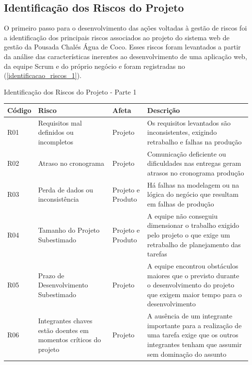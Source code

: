 \documentclass[
	12pt,				%
	openany,			%
	oneside,			%
	a4paper,			%
	english,			%
	french,				%
	spanish,			%
	brazil				%
	]{abntex2}
\begin{document}
\subsection{Identificação dos Riscos do Projeto}
O primeiro passo para o desenvolvimento das ações voltadas à gestão de riscos foi a identificação dos principais riscos associados ao projeto do sistema web de gestão da Pousada Chalés Água de Coco. Esses riscos foram levantados a partir da análise das características inerentes ao desenvolvimento de uma aplicação web, da equipe Scrum e do próprio negócio  e foram registradas no (\autoref{identificacao_riscos_1}).
\\
% 
\begin{quadro}[H]
	\caption{Identificação dos Riscos do Projeto - Parte 1} \label{identificacao_riscos_1} 
	\begin{tabular}{|>{\centering\arraybackslash}p{2cm}|>{\centering\arraybackslash}p{5cm}|>{\centering\arraybackslash}p{3cm}|p{4.2cm}|}
		\hline
		\textbf{Código} & \textbf{Risco} & \textbf{Afeta} & \textbf{Descrição}  \\
		\hline
		R01 & Requisitos mal definidos ou incompletos &
		Projeto  & Os requisitos levantados são inconsistentes, exigindo retrabalho e falhas na produção \\
		\hline
		R02 & Atraso no cronograma &
		Projeto  & Comunicação deficiente ou dificuldades nas entregas geram atrasos no cronograma produção \\
		\hline
		R03 & Perda de dados ou inconsistência &
		Projeto e \newline Produto  & Há falhas na modelagem ou na lógica do negócio que resultam em falhas de produção \\ \hline
		R04 & Tamanho do Projeto Subestimado &
		Projeto e Produto  & A equipe não conseguiu dimensionar o trabalho exigido pelo projeto o que exige um retrabalho de planejamento das tarefas \\
		\hline
		R05 & Prazo de Desenvolvimento Subestimado &
		Projeto & A equipe encontrou obstáculos maiores que o previsto durante o desenvolvimento do projeto que exigem maior tempo para o desenvolvimento \\
		\hline
		R06 & 	Integrantes chaves estão doentes em momentos críticos do projeto & Projeto & A ausência de um integrante importante para a realização de uma tarefa exige que os outros integrantes tenham que assumir sem dominação do assunto \\
		\hline
	\end{tabular}
\end{quadro}		
\end{document}
